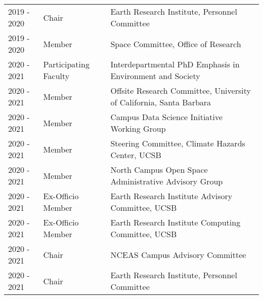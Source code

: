 \begin{longtable}{llp{12cm}}
2019 - 2020 & Chair & Earth Research Institute, Personnel Committee \\
2019 - 2020 & Member & Space Committee, Office of Research \\
2020 - 2021 & Participating Faculty & Interdepartmental PhD Emphasis in Environment and Society \\
2020 - 2021 & Member & Offsite Research Committee, University of California, Santa Barbara \\
2020 - 2021 & Member & Campus Data Science Initiative Working Group \\
2020 - 2021 & Member & Steering Committee, Climate Hazards Center, UCSB \\
2020 - 2021 & Member & North Campus Open Space Administrative Advisory Group \\
2020 - 2021 & Ex-Officio Member & Earth Research Institute Advisory Committee, UCSB \\
2020 - 2021 & Ex-Officio Member & Earth Research Institute Computing Committee, UCSB \\
2020 - 2021 & Chair & NCEAS Campus Advisory Committee  \\
2020 - 2021 & Chair & Earth Research Institute, Personnel Committee \\
\end{longtable}

